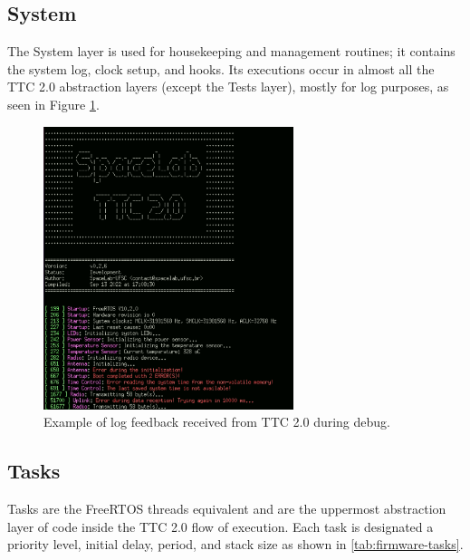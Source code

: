 \subsection{System}

The System layer is used for housekeeping and management routines; it contains the system log, clock setup, and hooks. Its executions occur in almost all the TTC 2.0 abstraction layers (except the Tests layer), mostly for log purposes, as seen in Figure \ref{fig:log_info}.

\begin{figure}[!ht]
	\begin{center}
		\includegraphics[width=0.65\textwidth]{figures/ttc2-terminal-log.png}
		\caption{Example of log feedback received from TTC 2.0 during debug.}
		\label{fig:log_info}
	\end{center}
\end{figure}

\subsection{Tasks}

Tasks are the FreeRTOS threads equivalent and are the uppermost abstraction layer of code inside the TTC 2.0 flow of execution. Each task is designated a priority level, initial delay, period, and stack size as shown in \autoref{tab:firmware-tasks}.

